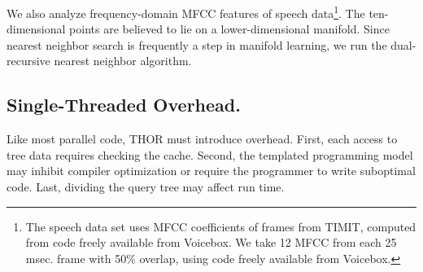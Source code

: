 \documentclass[twoside,leqno,twocolumn]{article}
\newcommand{\mysub}[1]{\subsection{#1.}}
\begin{document}
We also analyze frequency-domain MFCC features of speech data\footnote{The speech data set uses MFCC coefficients of frames from TIMIT, computed from code freely available from Voicebox.
   We take 12 MFCC from each 25 msec. frame with 50\% overlap, using code freely available from Voicebox.}.
The ten-dimensional points are believed to lie on a lower-dimensional manifold.
Since nearest neighbor search is frequently a step in manifold learning, we run the dual-recursive nearest neighbor algorithm.



\mysub{Single-Threaded Overhead}

Like most parallel code, THOR must introduce overhead.
First, each access to tree data requires checking the cache.
Second, the templated programming model may inhibit compiler optimization or require the programmer to write suboptimal code.
Last, dividing the query tree may affect run time.
\end{document}
